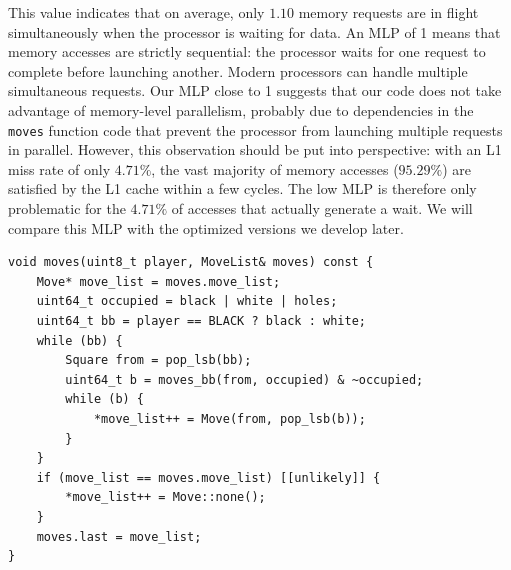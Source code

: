 \documentclass[12pt,a4paper,twoside,openright]{book}
\begin{document}
\begin{itemize}
This value indicates that on average, only $1.10$ memory requests are in flight simultaneously when the processor is waiting for data. An MLP of 1 means that memory accesses are strictly sequential: the processor waits for one request to complete before launching another. Modern processors can handle multiple simultaneous requests. Our MLP close to 1 suggests that our code does not take advantage of memory-level parallelism, probably due to dependencies in the \texttt{moves} function code that prevent the processor from launching multiple requests in parallel. However, this observation should be put into perspective: with an L1 miss rate of only $4.71\%$, the vast majority of memory accesses ($95.29\%$) are satisfied by the L1 cache within a few cycles. The low MLP is therefore only problematic for the $4.71\%$ of accesses that actually generate a wait. We will compare this MLP with the optimized versions we develop later.

\end{itemize}

\begin{mdframed}[skipabove=\baselineskip,topline=false,rightline=false,bottomline=false,leftline=false,linewidth=1pt,linecolor=gray!40,innerleftmargin=8pt]
\begin{verbatim}
void moves(uint8_t player, MoveList& moves) const {
    Move* move_list = moves.move_list;
    uint64_t occupied = black | white | holes;
    uint64_t bb = player == BLACK ? black : white;
    while (bb) {
        Square from = pop_lsb(bb);
        uint64_t b = moves_bb(from, occupied) & ~occupied;
        while (b) {
            *move_list++ = Move(from, pop_lsb(b));
        }
    }
    if (move_list == moves.move_list) [[unlikely]] {
        *move_list++ = Move::none();
    }
    moves.last = move_list;
}
\end{verbatim}
\label{lst:random_games_perf2}
\end{mdframed}

\end{document}
